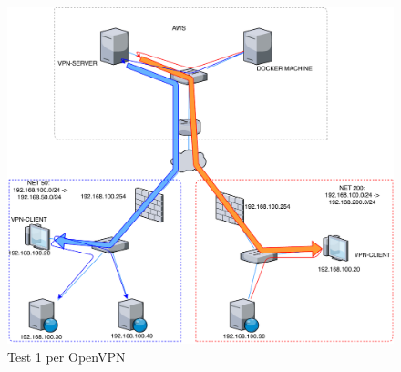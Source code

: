 \begin{figure}
  \includegraphics[scale=0.6]{img/openvpn_test1}
  \caption{Test 1 per OpenVPN}
  \label{fig:openvpn-test1}
\end{figure}

